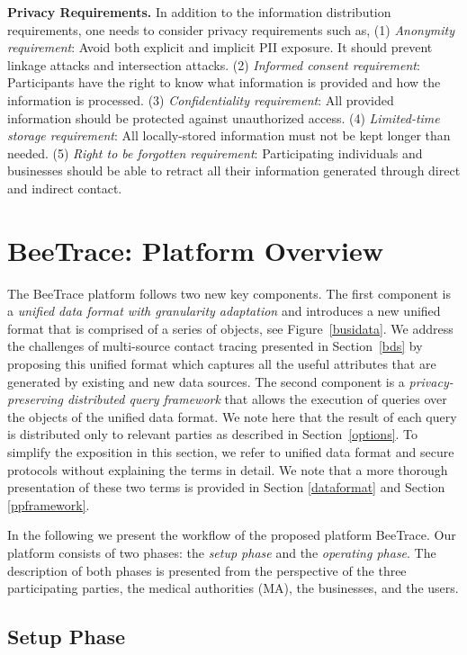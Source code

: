 \documentclass[11pt]{article}  %
\newcommand{\sysname}{\textsf{BeeTrace}\xspace}
\begin{document}
\textbf{Privacy Requirements. }In addition to the information distribution requirements, one needs to consider privacy requirements such as, (1) \emph{Anonymity requirement}: Avoid both explicit and implicit PII exposure. It should prevent linkage attacks and intersection attacks. 
(2) \emph{Informed consent requirement}: Participants have the right to know what information is provided and how the information is processed. (3) \emph{Confidentiality requirement}: All provided information should be protected against unauthorized access. 
(4) \emph{Limited-time storage requirement}: All locally-stored information must not be kept longer than needed. (5) \emph{Right to be forgotten requirement}: Participating individuals and businesses should be able to retract all their information generated through direct and indirect contact.


\section{\sysname: Platform Overview}
\label{poverview}

The \sysname platform follows two new key components. 
The first component is a \emph{unified data format with granularity adaptation} and introduces a new unified format that is comprised of a series of objects, see Figure~\ref{busidata}.
We address the challenges of multi-source contact tracing presented in Section~\ref{bds} by proposing this unified format which captures all the useful attributes that are generated by existing and new data sources. 
The second component is a \emph{privacy-preserving distributed query framework} that allows the execution of queries over the objects of the unified data format. 
We note here that the result of each query is distributed only to relevant parties as described in Section~\ref{options}. 
To simplify the exposition in this section, we refer to unified data format and secure protocols without explaining the terms in detail. 
We note that a more thorough presentation of these two terms is provided in Section \ref{dataformat} and Section \ref{ppframework}.

In the following we present the workflow of the proposed platform \sysname. 
Our platform consists of two phases: the \emph{setup phase} and the \emph{operating phase}. 
The description of both phases is presented from the perspective of the three participating parties, the medical authorities (MA), the businesses, and the users. 


\subsection{Setup Phase}
\end{document}

